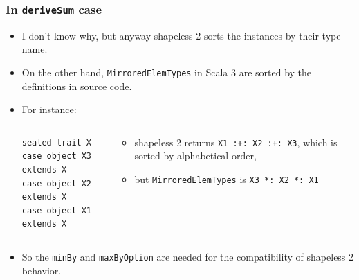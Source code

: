 \begin{frame}[fragile]
  \frametitle{ In \lstinline|deriveSum| case}

  \begin{itemize}
    \item<+-> I don't know why, but anyway shapeless 2 sorts the instances by their type name\cite{shapeless2_sort}.
  
    \item<+-> On the other hand, \lstinline|MirroredElemTypes| in Scala 3 are sorted by the definitions in source code.

    \item<+-> For instance:
    \begin{columns}
      \begin{column}{0.28\textwidth}
\begin{lstlisting}[style=scala]
sealed trait X
case object X3 extends X
case object X2 extends X
case object X1 extends X
\end{lstlisting}
      \end{column}
      \begin{column}{0.57\textwidth}
        \begin{itemize}
          \item shapeless 2 returns \lstinline|X1 :+: X2 :+: X3|, which is sorted by alphabetical order,
          \item but \lstinline|MirroredElemTypes| is \lstinline|X3 *: X2 *: X1|
        \end{itemize}
      \end{column}
    \end{columns}

    \item<+-> So the \lstinline|minBy| and \lstinline|maxByOption| are needed for
    the compatibility of shapeless 2 behavior.
  \end{itemize}

\end{frame}

